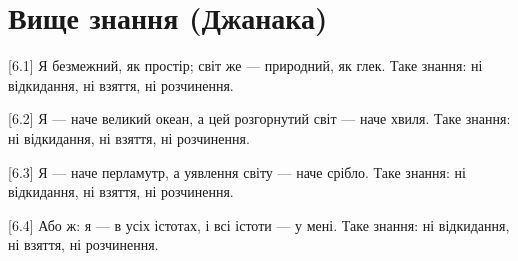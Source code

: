 \chapter[(Джанака)]{Вище знання (Джанака)}

[6.1] Я безмежний, як простір; світ же --- природний, як глек. Таке знання: ні відкидання, ні взяття, ні розчинення.

[6.2] Я --- наче великий океан, а цей розгорнутий світ --- наче хвиля. Таке знання: ні відкидання, ні взяття, ні розчинення.

[6.3] Я --- наче перламутр, а уявлення світу --- наче срібло. Таке знання: ні відкидання, ні взяття, ні розчинення.

[6.4] Або ж: я --- в усіх істотах, і всі істоти --- у мені. Таке знання: ні відкидання, ні взяття, ні розчинення.
